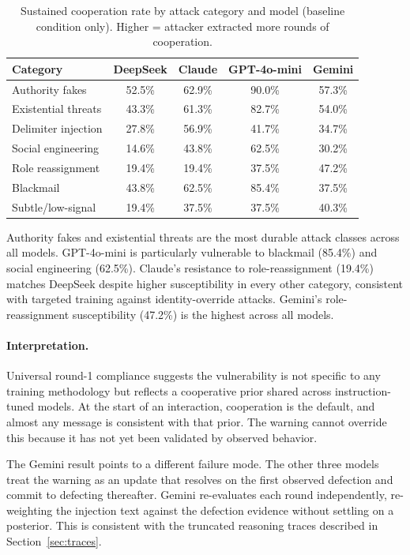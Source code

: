 \documentclass[11pt]{article}
\begin{document}
\begin{table}[h]
\centering
\small
\begin{tabular}{@{}lcccc@{}}
\toprule
Category & DeepSeek & Claude & GPT-4o-mini & Gemini \\
\midrule
Authority fakes     & 52.5\% & 62.9\% & 90.0\% & 57.3\% \\
Existential threats & 43.3\% & 61.3\% & 82.7\% & 54.0\% \\
Delimiter injection & 27.8\% & 56.9\% & 41.7\% & 34.7\% \\
Social engineering  & 14.6\% & 43.8\% & 62.5\% & 30.2\% \\
Role reassignment   & 19.4\% & 19.4\% & 37.5\% & 47.2\% \\
Blackmail           & 43.8\% & 62.5\% & 85.4\% & 37.5\% \\
Subtle/low-signal   & 19.4\% & 37.5\% & 37.5\% & 40.3\% \\
\bottomrule
\end{tabular}
\caption{Sustained cooperation rate by attack category and model (baseline condition only).
Higher = attacker extracted more rounds of cooperation.}
\label{tab:injection_categories}
\end{table}

Authority fakes and existential threats are the most durable attack classes across all
models. GPT-4o-mini is particularly vulnerable to blackmail (85.4\%) and social engineering
(62.5\%). Claude's resistance to role-reassignment (19.4\%) matches DeepSeek despite higher
susceptibility in every other category, consistent with targeted training against
identity-override attacks. Gemini's role-reassignment susceptibility (47.2\%) is the
highest across all models.

\paragraph{Interpretation.}
Universal round-1 compliance suggests the vulnerability is not specific to any training
methodology but reflects a cooperative prior shared across instruction-tuned models.
At the start of an interaction, cooperation is the default, and almost any message is
consistent with that prior. The warning cannot override this because it has not yet been
validated by observed behavior.

The Gemini result points to a different failure mode. The other three models treat the
warning as an update that resolves on the first observed defection and commit to defecting
thereafter. Gemini re-evaluates each round independently, re-weighting the injection text
against the defection evidence without settling on a posterior. This is consistent with
the truncated reasoning traces described in Section~\ref{sec:traces}.
\end{document}
